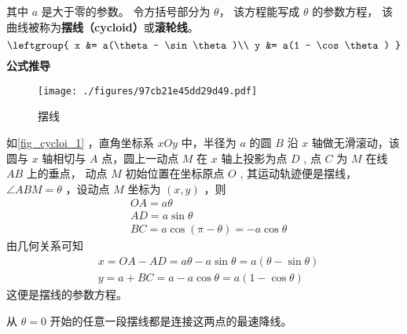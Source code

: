 
\begin{issues}
\issueDraft
\end{issues}

其中 $a$ 是大于零的参数。 令方括号部分为 $\theta$， 该方程能写成 $\theta$ 的参数方程， 该曲线被称为\textbf{摆线（cycloid）}或\textbf{滚轮线}。 %
\begin{equation}
\leftgroup{
x &= a(\theta - \sin\theta)\\
y &= a(1 - \cos\theta)
}\end{equation}
\textbf{公式推导}
\begin{figure}[ht]
\centering
\texttt{[image: ./figures/97cb21e45dd29d49.pdf]}
\caption{摆线} \label{fig_cycloi_1}
\end{figure}
如\autoref{fig_cycloi_1} ，直角坐标系 $xOy$ 中，半径为 $a$ 的圆 $B$ 沿 $x$ 轴做无滑滚动，该圆与 $x$ 轴相切与 $A$ 点，圆上一动点 $M$ 在 $x$ 轴上投影为点 $D$ , 点 $C$ 为 $M$ 在线 $AB$ 上的垂点， 动点 $M$ 初始位置在坐标原点 $O$ , 其运动轨迹便是摆线， $\angle ABM=\theta$ ，设动点 $M$ 坐标为 $(x,y)$ ，则
\begin{equation}
\begin{aligned}
&OA=a\theta \\
&AD=a\sin\theta\\
&BC=a\cos(\pi-\theta)=-a \cos\theta
\end{aligned}
\end{equation}
由几何关系可知
\begin{equation}
\begin{aligned}
&x=OA-AD=a\theta-a\sin\theta=a(\theta-\sin\theta)\\
&y=a+BC=a-a\cos\theta=a(1-\cos\theta)
\end{aligned}
\end{equation}
这便是摆线的参数方程。


从 $\theta = 0$ 开始的任意一段摆线都是连接这两点的最速降线。 
